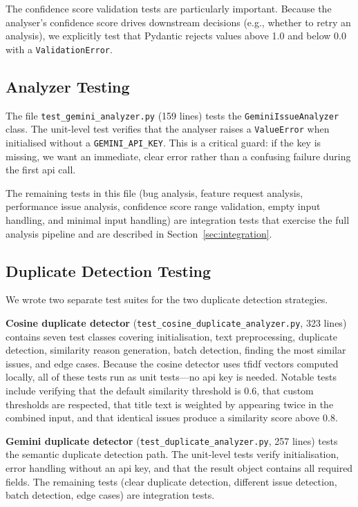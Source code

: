 The confidence score validation tests are particularly important. Because the analyser's confidence score drives downstream decisions (e.g., whether to retry an analysis), we explicitly test that Pydantic rejects values above 1.0 and below 0.0 with a \texttt{ValidationError}.

\subsection{Analyzer Testing}

The file \texttt{test\_gemini\_analyzer.py} (159 lines) tests the \texttt{GeminiIssueAnalyzer} class. The unit-level test verifies that the analyser raises a \texttt{ValueError} when initialised without a \texttt{GEMINI\_API\_KEY}. This is a critical guard: if the key is missing, we want an immediate, clear error rather than a confusing failure during the first \gls{api} call.

The remaining tests in this file (bug analysis, feature request analysis, performance issue analysis, confidence score range validation, empty input handling, and minimal input handling) are integration tests that exercise the full analysis pipeline and are described in Section~\ref{sec:integration}.

\subsection{Duplicate Detection Testing}

We wrote two separate test suites for the two duplicate detection strategies.

\textbf{Cosine duplicate detector} (\texttt{test\_cosine\_duplicate\_analyzer.py}, 323 lines) contains seven test classes covering initialisation, text preprocessing, duplicate detection, similarity reason generation, batch detection, finding the most similar issues, and edge cases. Because the cosine detector uses \gls{tfidf} vectors computed locally, all of these tests run as unit tests---no \gls{api} key is needed. Notable tests include verifying that the default similarity threshold is 0.6, that custom thresholds are respected, that title text is weighted by appearing twice in the combined input, and that identical issues produce a similarity score above 0.8.

\textbf{Gemini duplicate detector} (\texttt{test\_duplicate\_analyzer.py}, 257 lines) tests the semantic duplicate detection path. The unit-level tests verify initialisation, error handling without an \gls{api} key, and that the result object contains all required fields. The remaining tests (clear duplicate detection, different issue detection, batch detection, edge cases) are integration tests.


